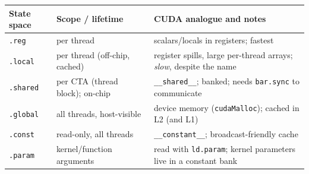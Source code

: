 \documentclass[10pt,a4paper,openany,oneside]{report}
\begin{document}
\begin{center}\small
\begin{xltabular}{\textwidth}{@{}L{2.2cm}L{4.1cm}Y@{}}
\toprule
\textbf{State space} & \textbf{Scope / lifetime} & \textbf{CUDA analogue and notes}\\
\midrule\endhead
\texttt{.reg} & per thread & scalars/locals in registers; fastest\\
\texttt{.local} & per thread (off-chip, cached) & register spills, large per-thread arrays; \emph{slow}, despite the name\\
\texttt{.shared} & per CTA (thread block); on-chip & \texttt{\_\_shared\_\_}; banked; needs \texttt{bar.sync} to communicate\\
\texttt{.global} & all threads, host-visible & device memory (\texttt{cudaMalloc}); cached in L2 (and L1)\\
\texttt{.const} & read-only, all threads & \texttt{\_\_constant\_\_}; broadcast-friendly cache\\
\texttt{.param} & kernel/function arguments & read with \texttt{ld.param}; kernel parameters live in a constant bank\\
\bottomrule
\end{xltabular}
\end{center}
\end{document}
